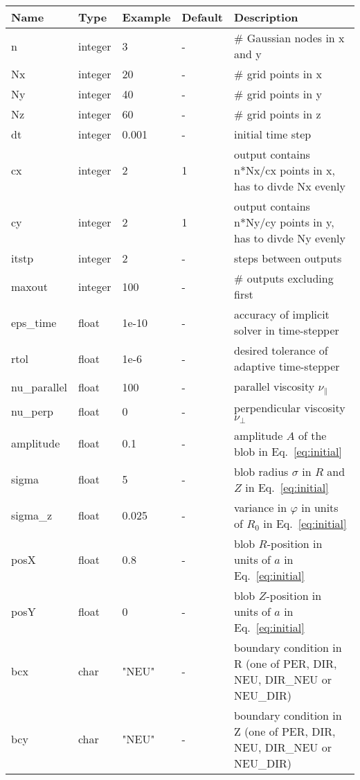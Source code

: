 \begin{longtable}{llll>{\RaggedRight}p{7cm}}
\toprule
\rowcolor{gray!50}\textbf{Name} &  \textbf{Type} & \textbf{Example} & \textbf{Default} & \textbf{Description}  \\ \midrule
  n      & integer & 3 & - &\# Gaussian nodes in x and y \\
  Nx     & integer &20& - &\# grid points in x \\
  Ny     & integer &40& - &\# grid points in y \\
  Nz     & integer &60& - &\# grid points in z \\
  dt     & integer &0.001& - &initial time step\\
  cx & integer & 2 & 1 & output contains n*Nx/cx points in x,
    has to divde Nx evenly\\
  cy & integer & 2 & 1 & output contains n*Ny/cy points in y,
    has to divde Ny evenly\\
  itstp  & integer &2  & - &   steps between outputs \\
  maxout & integer &100& - &      \# outputs excluding first \\
  eps\_time  & float &1e-10   & - & accuracy of implicit solver in time-stepper \\
  rtol  & float  & 1e-6  & - & desired tolerance of adaptive time-stepper \\
  nu\_parallel    & float &100   & - & parallel viscosity $\nu_\parallel$ \\
  nu\_perp    & float &0   & - & perpendicular viscosity $\nu_\perp$ \\
  amplitude  & float &0.1    & - & amplitude $A$ of the blob in Eq.~\eqref{eq:initial}\\
  sigma      & float &5     & - & blob radius $\sigma$ in $R$ and $Z$ in Eq.~\eqref{eq:initial} \\
  sigma\_z   & float &0.025  & - & variance in $\varphi$ in units of $R_0$ in Eq.~\eqref{eq:initial}  \\
  posX       & float &0.8    & - & blob $R$-position in units of $a$ in Eq.~\eqref{eq:initial} \\
  posY       & float &0    & - & blob $Z$-position in units of $a$ in Eq.~\eqref{eq:initial} \\
  bcx   & char & "NEU"      & - & boundary condition in R (one of PER, DIR, NEU, DIR\_NEU or NEU\_DIR) \\
  bcy   & char & "NEU"      & - & boundary condition in Z (one of PER, DIR, NEU, DIR\_NEU or NEU\_DIR) \\

\end{longtable}
